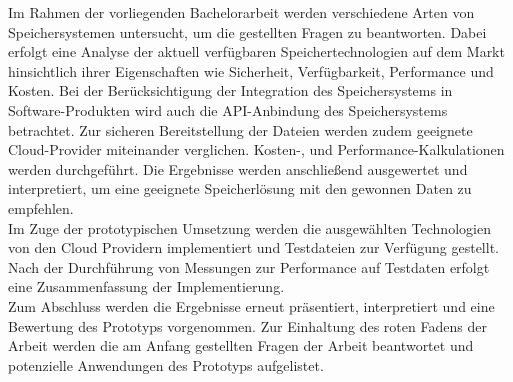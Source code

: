 Im Rahmen der vorliegenden Bachelorarbeit werden verschiedene Arten von Speichersystemen untersucht, um die gestellten Fragen zu beantworten. Dabei erfolgt eine Analyse der aktuell verfügbaren Speichertechnologien auf dem Markt hinsichtlich ihrer Eigenschaften wie Sicherheit, Verfügbarkeit, Performance und Kosten. Bei der Berücksichtigung der Integration des Speichersystems in Software-Produkten wird auch die API-Anbindung des Speichersystems betrachtet. Zur sicheren Bereitstellung der Dateien werden zudem geeignete Cloud-Provider miteinander verglichen. Kosten-, und Performance-Kalkulationen werden durchgeführt. Die Ergebnisse werden anschließend ausgewertet und interpretiert, um eine geeignete Speicherlösung mit den gewonnen Daten zu empfehlen.\\

Im Zuge der prototypischen Umsetzung werden die ausgewählten Technologien von den Cloud Providern implementiert und Testdateien zur Verfügung gestellt. Nach der Durchführung von Messungen zur Performance auf Testdaten erfolgt eine Zusammenfassung der Implementierung.\\

Zum Abschluss werden die Ergebnisse erneut präsentiert, interpretiert und eine Bewertung des Prototyps vorgenommen. Zur Einhaltung des roten Fadens der Arbeit werden die am Anfang gestellten Fragen der Arbeit beantwortet und potenzielle Anwendungen des Prototyps aufgelistet.

